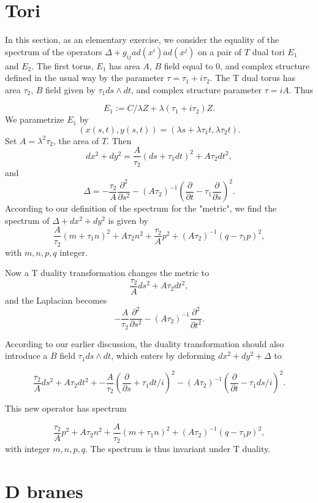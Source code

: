 \documentclass[a4paper,11pt]{amsart}
\begin{document}
\section{Tori}
In this section, as an elementary exercise, we consider the equality 
of the spectrum of 
the operators $\Delta + g_{ij}ad(x^i)ad(x^j)$ on a pair of $T$ dual tori $E_1$
and $E_2$. The
first torus, $E_1$  has area $A$, $B$ field equal to $0$, and complex structure
defined in the usual way by the parameter $\tau = \tau_1 + i\tau_2$. The 
T dual torus has area $\tau_2$, $B$ field given by $\tau_1 ds\wedge dt$, and
 complex structure parameter $\tau = iA$. Thus
 
$$E_1:= C/\lambda Z + \lambda(\tau_1+i\tau_2) Z.$$
We parametrize $E_1$ by 
$$(x(s,t),y(s,t)) = (\lambda s + \lambda \tau_1 t,\lambda \tau_2 t).$$
Set $A = \lambda^2\tau_2$, the area of $T$. Then 
$$dx^2 + dy^2 = \frac{A}{\tau_2}(ds+\tau_1dt)^2 + A\tau_2dt^2,$$
and
$$\Delta = -\frac{\tau_2}{A}\frac{\partial^2}{\partial s^2}
 - (A\tau_2)^{-1}(\frac{\partial}{\partial t} - \tau_1\frac{\partial}{\partial s})^2.
$$
According to our definition of the spectrum for the "metric",
we find the spectrum of $\Delta + dx^2+dy^2$ is given by 
$$\frac{A}{\tau_2}(m+\tau_1n)^2 + A\tau_2n^2 + \frac{\tau_2}{A}p^2
 + (A\tau_2)^{-1}(q - \tau_1p)^2,$$
 with $m,n,p,q$ integer.

Now a T duality transformation changes the metric to 
$$\frac{\tau_2}{A}ds^2 + A\tau_2dt^2,$$
and the Laplacian becomes 
$$-\frac{A}{\tau_2}\frac{\partial^2}{\partial s^2}
 - (A\tau_2)^{-1}\frac{\partial^2}{\partial t^2}.$$ 

According to our earlier discussion, the duality transformation should also 
introduce a $B$ field $\tau_1 ds\wedge dt$, which enters by deforming 
$dx^2+dy^2 + \Delta$ to 

$$\frac{\tau_2}{A}ds^2 + A\tau_2dt^2 + 
-\frac{A}{\tau_2}(\frac{\partial}{\partial s} + \tau_1 dt/i)^2
 - (A\tau_2)^{-1}(\frac{\partial}{\partial t} - \tau_1 ds/i)^2.$$ 

This new operator has spectrum 

$$\frac{\tau_2}{A}p^2 + A\tau_2n^2 + \frac{A}{\tau_2}(m+\tau_1 n)^2
 + (A\tau_2)^{-1}(q-\tau_1 p)^2,$$
 with integer $m,n,p,q$.
 The spectrum is thus invariant under T duality.  
  

\section{D branes}  
\end{document}
